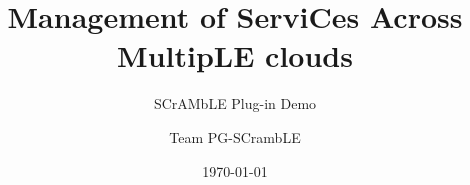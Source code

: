 \title{Management of ServiCes Across MultipLE clouds} 

\subtitle{SCrAMbLE Plug-in Demo}

\author{Team PG-SCrambLE}


\date{\today} 

\newcommand{\upbcolor}{uni-blue} 

